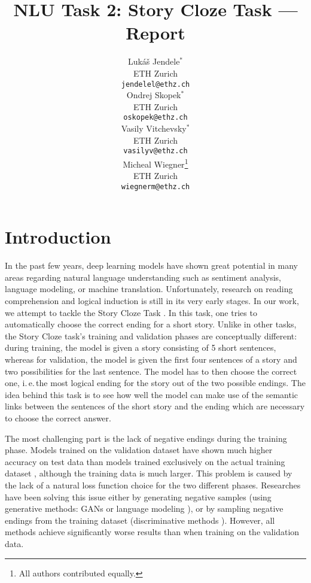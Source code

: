 \documentclass{article}
\title{NLU Task 2: Story Cloze Task --- Report}
\author{
  Luk\'{a}\v{s} Jendele$^\ast$\\
  ETH Zurich\\
  \texttt{jendelel@ethz.ch}\\
  \And
  Ondrej Skopek$^\ast$\\
  ETH Zurich\\
  \texttt{oskopek@ethz.ch}\\
  \And
  Vasily Vitchevsky$^\ast$\\
  ETH Zurich\\
  \texttt{vasilyv@ethz.ch}\\
  \And
  Micheal Wiegner\thanks{All authors contributed equally.}\\
  ETH Zurich\\
  \texttt{wiegnerm@ethz.ch}\\
}
\begin{document}
\maketitle


\section{Introduction}\label{sec:intro}
In the past few years, deep learning models have shown great potential in many areas regarding natural language understanding such as sentiment analysis, language modeling, or machine translation. Unfortunately, research on reading comprehension and logical induction is still in its very early stages. In our work, we attempt to tackle the Story Cloze Task \citep{Mostafazadeh2016AStories}. In this task, one tries to automatically choose the correct ending for a short story. Unlike in other tasks, the Story Cloze task's training and validation phases are conceptually different: during training, the model is given a story consisting of 5 short sentences, whereas for validation, the model is given the first four sentences of a story and two possibilities for the last sentence. The model has to then choose the correct one, i.\,e.\,the most logical ending for the story out of the two possible endings. The idea behind this task is to see how well the model can make use of the semantic links between the sentences of the short story and the ending which are necessary to choose the correct answer.

The most challenging part is the lack of negative endings during the training phase. Models trained on the validation dataset \citep{Srinivasan2018ATest,Roemmele2017AnTest} have shown much higher accuracy on test data than models trained exclusively on the actual training dataset \citep{Roemmele2017AnTest,Wang2017ConditionalComprehension}, although the training data is much larger. This problem is caused by the lack of a natural loss function choice for the two different phases. Researches have been solving this issue either by generating negative samples (using generative methods: GANs \citep{Wang2017ConditionalComprehension} or language modeling \citep{Roemmele2017AnTest}), or by sampling negative endings from the training dataset (discriminative methods \citep{Roemmele2017AnTest}). However, all methods achieve significantly worse results than when training on the validation data.
\end{document}
